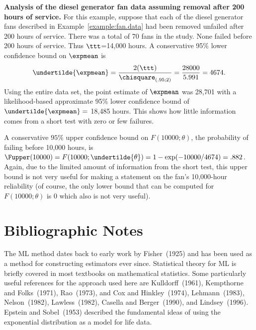 \begin{example}
{\bf Analysis of the diesel generator fan data assuming removal after
200 hours of service.} For this example, suppose that each of the
diesel generator fans described in Example~\ref{example:fan.data} had
been removed unfailed after 200 hours of service. There was a total of
70 fans in the study. None failed before 200 hours of service.  Thus
$\ttt$=14,000 hours. A conservative 95\% lower confidence bound on
$\expmean$ is
\begin{displaymath}
\undertilde{\expmean} = 
\frac{2 (\ttt)}{ \chisquare_{(.95;2)}} =
\frac{28000}{ 5.991} =  4674.
\end{displaymath}
Using the entire data set, the point estimate of $\expmean$ was 28,701
with a likelihood-based approximate 95\% lower confidence bound of
$\undertilde{\expmean}=$ 18,485 hours.  This shows how little
information comes from a short test with zero or few failures.  

A conservative $95\%$ upper confidence bound on $F(10000;\theta)$,
the probability of failing before 10,000 hours, is
$\Fupper(10000)=F(10000;
\undertilde{\theta})=1-\exp(-10000/4674) = .882$. Again, due to the
limited amount of information from the short test, this upper bound is
not very useful for making a statement on the fan's 10,000-hour
reliability (of course, the only lower bound that can be computed for
$F(10000;\theta)$ is $0$ which also is not very useful).
\end{example}

\section*{Bibliographic Notes}

The ML method dates back to early work by Fisher~(1925) and has been
used as a method for constructing estimators ever since.
Statistical theory for ML is briefly covered in most textbooks on
mathematical statistics. Some particularly useful references for the
approach used here are Kulldorff~(1961), Kempthorne and
Folks~(1971), Rao~(1973), and Cox and Hinkley~(1974),
Lehmann~(1983), Nelson~(1982), Lawless~(1982), Casella and
Berger~(1990), and Lindsey~(1996).  Epstein and Sobel~(1953)
described the fundamental ideas of using the exponential
distribution as a model for life data.

